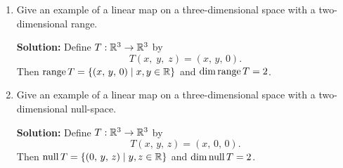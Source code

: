 \begin{enumerate}
    \item Give an example of a linear map on a three-dimensional space with a two-dimensional range.\vspace{0.4in}
    \begin{mybox}
        \textbf{Solution: } Define $T : \mathbb{R}^3 \to \mathbb{R}^3$ by
        $$T(x,\;y,\;z) = (x,\,y,\,0).$$
        Then $\operatorname{range}T = \{(x,\,y,\,0) \mid x,y\in \mathbb{R}\}$ and $\operatorname{dim}\operatorname{range}{T} = 2$.
    \end{mybox}
    \newpage
    \item Give an example of a linear map on a three-dimensional space with a two-dimensional null-space.\vspace{0.4in}
    \begin{mybox}
        \textbf{Solution: } Define $T : \mathbb{R}^3 \to \mathbb{R}^3$ by
        $$T(x,\,y,\,z) = (x,\,0,\,0).$$
        Then $\operatorname{null}T = \{(0,\,y,\,z) \mid y,z \in \mathbb{R}\}$ and $\operatorname{dim}\operatorname{null}{T} = 2$.
    \end{mybox}

\end{enumerate}